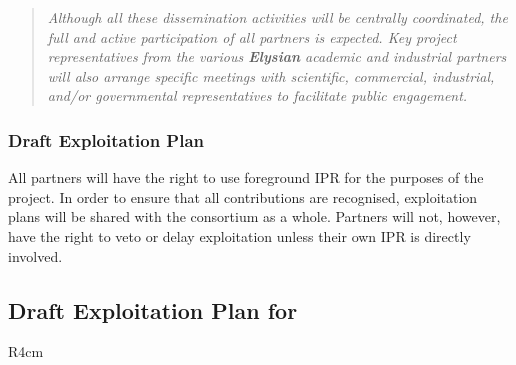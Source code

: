 \documentclass[a4paper,11pt]{article}
\newcommand{\project}[1]{\textbf{#1}\xspace}
\newcommand{\SECURITY}{\project{Elysian}}
\newcommand{\TheProject}{\SECURITY}
\begin{document}

\begin{quote}

\emph{Although all these dissemination activities
will be centrally coordinated, the full and active participation of
all partners is expected. Key project representatives from
the various \TheProject{} academic and industrial
partners will also arrange specific meetings
with scientific, commercial, industrial, and/or
governmental representatives to facilitate public
engagement.}
\end{quote}

\subsubsection{Draft Exploitation Plan}
\label{sect:exploitation-plan}
\vspace{-12pt}

All partners will have the right to use foreground IPR for
the purposes of the project. In order to ensure that all
contributions are recognised, exploitation plans will be
shared with the consortium as a whole. Partners will not,
however, have the right to veto or delay exploitation
unless their own IPR is directly involved.


\horizontalline

\subsection*{Draft Exploitation Plan for \IBMshort{}}

\begin{wrapfigure}{R}{4cm}
\vspace{-1.4cm}
\hfill {}
\vspace{-0.6cm}
\end{wrapfigure}
\end{document}
